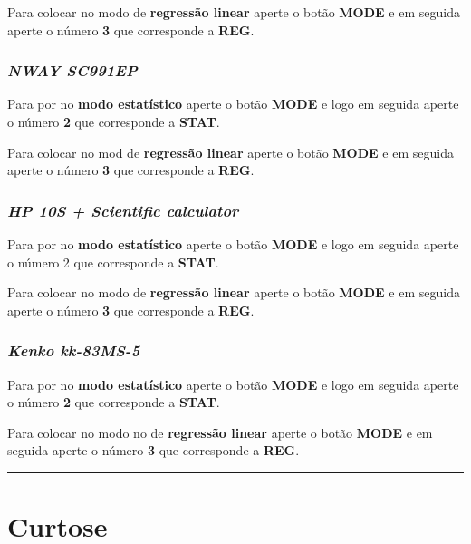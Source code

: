 \documentclass[]{book}
\begin{document}
Para colocar no modo de \textbf{regressão linear} aperte o botão \textbf{MODE} e em seguida aperte o número \textbf{3} que corresponde a \textbf{REG}.

\hypertarget{nway-sc991ep}{%
\subsubsection{\texorpdfstring{\textbf{\emph{NWAY SC991EP}}}{NWAY SC991EP}}\label{nway-sc991ep}}

Para por no \textbf{modo estatístico} aperte o botão \textbf{MODE} e logo em seguida aperte o número \textbf{2} que corresponde a \textbf{STAT}.

Para colocar no mod de \textbf{regressão linear} aperte o botão \textbf{MODE} e em seguida aperte o número \textbf{3} que corresponde a \textbf{REG}.

\hypertarget{hp-10s-scientific-calculator}{%
\subsubsection{\texorpdfstring{\textbf{\emph{HP 10S + Scientific calculator}}}{HP 10S + Scientific calculator}}\label{hp-10s-scientific-calculator}}

Para por no \textbf{modo estatístico} aperte o botão \textbf{MODE} e logo em seguida aperte o número 2 que corresponde a \textbf{STAT}.

Para colocar no modo de \textbf{regressão linear} aperte o botão \textbf{MODE} e em seguida aperte o número \textbf{3} que corresponde a \textbf{REG}.

\hypertarget{kenko-kk-83ms-5}{%
\subsubsection{\texorpdfstring{\textbf{\emph{Kenko kk-83MS-5}}}{Kenko kk-83MS-5}}\label{kenko-kk-83ms-5}}

Para por no \textbf{modo estatístico} aperte o botão \textbf{MODE} e logo em seguida aperte o número \textbf{2} que corresponde a \textbf{STAT}.

Para colocar no modo no de \textbf{regressão linear} aperte o botão \textbf{MODE} e em seguida aperte o número \textbf{3} que corresponde a \textbf{REG}.

\begin{center}\rule{0.5\linewidth}{\linethickness}\end{center}

\hypertarget{curtose-2}{%
\section{Curtose}\label{curtose-2}}
\end{document}
